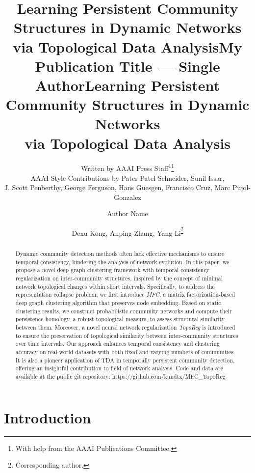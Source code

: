 \documentclass[letterpaper]{article} %
\title{Learning Persistent Community Structures in Dynamic Networks \\via Topological Data Analysis}
\author{
    Written by AAAI Press Staff\textsuperscript{\rm 1}\thanks{With help from the AAAI Publications Committee.}\\
    AAAI Style Contributions by Pater Patel Schneider,
    Sunil Issar,\\
    J. Scott Penberthy,
    George Ferguson,
    Hans Guesgen,
    Francisco Cruz\equalcontrib,
    Marc Pujol-Gonzalez\equalcontrib
}
\title{My Publication Title --- Single Author}
\author {
    Author Name
}
\title{Learning Persistent Community Structures in Dynamic Networks \\via Topological Data Analysis}
\author {
    Dexu Kong,
    Anping Zhang,
    Yang Li\textsuperscript{\footnote{Corresponding author.}}
}
\begin{document}
\maketitle

\begin{abstract}
Dynamic community detection methods often lack effective mechanisms to ensure  temporal consistency, hindering the analysis of network evolution. In this paper, we propose a novel deep graph clustering framework with temporal consistency regularization  on   inter-community structures, inspired by %
the concept of minimal network topological changes within short intervals.
Specifically, to address the representation collapse problem, we first introduce \textit{MFC}, a matrix factorization-based deep graph clustering algorithm that preserves node embedding. Based on static clustering results, we construct probabilistic community networks and compute their persistence homology, a robust topological measure, to assess structural similarity between them. Moreover, a novel neural network regularization \textit{TopoReg} is introduced to ensure the preservation of topological similarity between inter-community structures over time intervals. Our approach enhances temporal consistency and clustering accuracy on real-world datasets with both fixed and varying numbers of communities. It is also a pioneer application of TDA in temporally persistent community detection, offering an insightful contribution to field of network analysis. Code and data are available at the public git repository: https://github.com/kundtx/MFC\_TopoReg
\end{abstract}

\section{Introduction}
\end{document}
